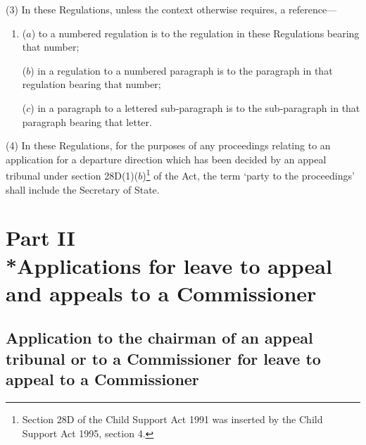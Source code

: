 \documentclass[12pt,a4paper]{article}
\begin{document}
(3) In these Regulations, unless the context otherwise requires, a reference—
\begin{enumerate}\item[]
($a$) to a numbered regulation is to the regulation in these Regulations bearing that number;

($b$) in a regulation to a numbered paragraph is to the paragraph in that regulation bearing that number;

($c$) in a paragraph to a lettered sub-paragraph is to the sub-paragraph in that paragraph bearing that letter.
\end{enumerate}

(4) In these Regulations, for the purposes of any proceedings relating to an application for a departure direction which has been decided by an appeal tribunal under section 28D(1)($b$)\footnote{\frenchspacing Section 28D of the Child Support Act 1991 was inserted by the Child Support Act 1995, section 4.} of the Act, the term ‘party to the proceedings’ shall include the Secretary of State.


\section[Part II --- Applications for leave to appeal and appeals to a Commissioner]{\sloppy Part II\\*Applications for leave to appeal and appeals to a Commissioner}

\renewcommand\parthead{--- Part II}

\subsection[2. Application to the chairman of an appeal tribunal or to a Commissioner for leave to appeal to a Commissioner]{Application to the chairman of an appeal tribunal or to a Commissioner for leave to appeal to a Commissioner}
\end{document}
